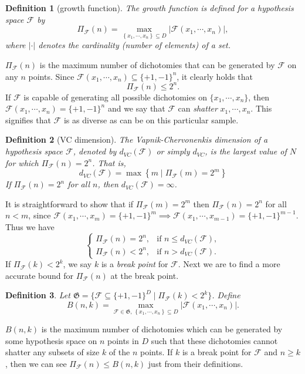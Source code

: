 \documentclass{report}
\newtheorem{definition}{Definition}[chapter]
\theoremstyle{nonumberplain}
\newcommand{\0}{\mathbf{0}}
\begin{document}
\begin{definition}[growth function]
	The \emph{growth function} is defined for a hypothesis space $\mathcal{F}$ by
	\[
	\Pi_{\mathcal{F}}(n)=\max _{\left\{x_{1}, \cdots, x_{n}\right\} \subseteq D}\left|\mathcal{F}\left({x}_{1}, \cdots, {x}_{n}\right)\right|,
	\]
	where $|\cdot|$ denotes the cardinality (number of elements) of a set.
\end{definition}
$\Pi_{\mathcal{F}}(n)$ is the maximum number of dichotomies that can be generated by $\mathcal{F}$ on any $n$ points. Since $\mathcal{F}\left({x}_{1}, \cdots, {x}_{n}\right)\subseteq\{+1,-1\}^n$,  it clearly holds that
\[
\Pi_{\mathcal{F}}(n)\le 2^n.
\]
If $\mathcal{F}$ is capable of generating all possible dichotomies on $\{x_{1}, \cdots, x_{n}\}$, then $\mathcal{F}\left({x}_{1}, \cdots, {x}_{n}\right)=\{+1,-1\}^n$ and we say that $\mathcal{F}$ can \emph{shatter} $x_{1}, \cdots, x_{n}$. This signifies that $\mathcal{F}$ is as diverse as can be on this particular sample. 

\begin{definition}[VC dimension]
	The Vapnik-Chervonenkis dimension of a hypothesis space $\mathcal{F}$, denoted by $d_{VC}(\mathcal{F})$  or simply $d_{VC}$, is the largest value of $N$ for which $\Pi_{\mathcal{F}}(n)=2^n$. That is,
	\[
	d_{VC}(\mathcal{F})=\max \left\{m \mid \Pi_{\mathcal{F}}(m)=2^{m}\right\}
	\]
	If $\Pi_{\mathcal{F}}(n)=2^n$ for all $n$, then $d_{VC}(\mathcal{F})=\infty$.
\end{definition}

It is straightforward to show that if $\Pi_{\mathcal{F}}(m)=2^{m}$ then $\Pi_{\mathcal{F}}(n)=2^{n}$ for all $n<m$, since $\mathcal{F}\left({x}_{1}, \cdots, {x}_{m}\right)=\{+1,-1\}^m\implies\mathcal{F}\left({x}_{1}, \cdots, {x}_{m-1}\right)=\{+1,-1\}^{m-1}$. Thus we have
\[
\begin{cases}
\Pi_{\mathcal{F}}(n)=2^n,&\text{if }n\le d_{VC}(\mathcal{F}),\\
\Pi_{\mathcal{F}}(n)<2^n,&\text{if }n> d_{VC}(\mathcal{F}).
\end{cases}
\]
If $\Pi_{\mathcal{F}}(k)<2^k$, we say $k$ is a \emph{break point} for $\mathcal{F}$. Next we are to find a more accurate bound for $\Pi_{\mathcal{F}}(n)$ at the break point.

\begin{definition} Let $\mathfrak{G}=\{\mathcal{F}\subseteq\{+1,-1\}^D\mid\Pi_{\mathcal{F}}(k)< 2^k\}$. Define
	\[
	B(n, k)=\max _{\mathcal{F}\in\mathfrak{G},\,\left\{x_{1}, \cdots, x_{n}\right\} \subseteq D}\left|\mathcal{F}\left({x}_{1}, \cdots, {x}_{n}\right)\right|.
	\]
\end{definition}
$B(n, k)$ is the maximum number of dichotomies which can be generated by some hypothesis space on $n$ points in $D$ such that these dichotomies cannot shatter any subsets of size $k$ of the $n$ points. If $k$ is a break point for $\mathcal{F}$ and $n\ge k$, then we can see $\Pi_{\mathcal{F}}(n)\le B(n, k)$ just from their definitions.
\end{document}
